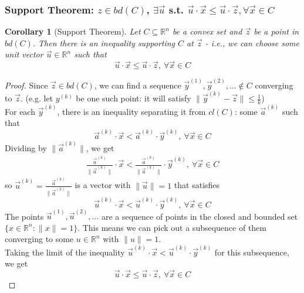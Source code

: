 \documentclass[11pt,a4paper]{article}
\newtheorem{corollary}{Corollary}
\begin{document}
\subsubsection{Support Theorem: $z\in bd(C)$, $\exists \vec{u}$ s.t. $\vec{u}\cdot \vec{x}\leq \vec{u}\cdot \vec{z}, \forall \vec{x}\in C$}
\begin{corollary}[Support Theorem]
    Let $C\subseteq \mathbb{R}^n$ be a convex set and $\vec{z}$ be a point in $bd(C)$. Then there is an inequality supporting $C$ at $\vec{z}$ - i.e., we can choose some unit vector $\vec{u}\in \mathbb{R}^n$ such that $$\vec{u}\cdot \vec{x}\leq \vec{u}\cdot \vec{z},\ \forall \vec{x}\in C$$
\end{corollary}
\begin{proof}
    Since $\vec{z}\in bd(C)$, we can find a sequence $\vec{y}^{(1)},\vec{y}^{(2)},...\notin C$ converging to $\vec{z}$. (e.g. let $y^{(k)}$ be one such point: it will satisfy $\|\vec{y}^{(k)}-\vec{z}\|\leq \frac{1}{k}$)\\
    For each $\vec{y}^{(k)}$, there is an inequality separating it from $cl(C)$: some $\vec{a}^{(k)}$ such that $$\vec{a}^{(k)}\cdot \vec{x}< \vec{a}^{(k)}\cdot \vec{y}^{(k)},\ \forall \vec{x}\in C$$
    Dividing by $\|\vec{a}^{(k)}\|$, we get
    \begin{equation}
        \begin{aligned}
            \frac{\vec{a}^{(k)}}{\|\vec{a}^{(k)}\|}\cdot \vec{x}<\frac{\vec{a}^{(k)}}{\|\vec{a}^{(k)}\|}\cdot \vec{y}^{(k)},\ \forall \vec{x}\in C
        \end{aligned}
        \nonumber
    \end{equation}
    so $\vec{u}^{(k)}=\frac{\vec{a}^{(k)}}{\|\vec{a}^{(k)}\|}$ is a vector with $\|\vec{u}\|=1$ that satisfies $$\vec{u}^{(k)}\cdot \vec{x}<\vec{u}^{(k)}\cdot \vec{y}^{(k)},\ \forall \vec{x}\in C$$
    The points $\vec{u}^{(1)},\vec{u}^{(2)},...$ are a sequence of points in the closed and bounded set $\{x \in \mathbb{R}^n : \|x\|= 1\}$. This means we can pick out a subsequence of them converging to some $u\in \mathbb{R}^n$ with $\|u\|= 1$.\\
    Taking the limit of the inequality $\vec{u}^{(k)}\cdot \vec{x}<\vec{u}^{(k)}\cdot \vec{y}^{(k)}$ for this subsequence, we get $$\vec{u}\cdot \vec{x}\leq \vec{u}\cdot \vec{z},\ \forall \vec{x}\in C$$
\end{proof}
\end{document}
